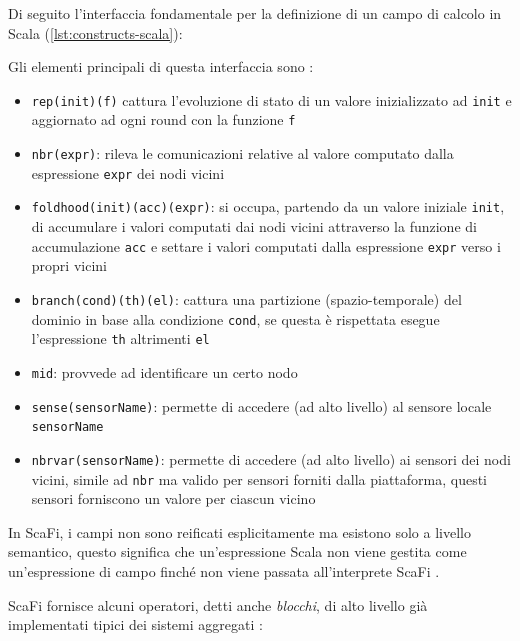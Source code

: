 \documentclass[12pt,a4paper,openright,twoside]{book}
\begin{document}
Di seguito l'interfaccia fondamentale per la definizione di un campo di calcolo in Scala (\cref{lst:constructs-scala}):



Gli elementi principali di questa interfaccia sono \cite{Casadei2022}:
\begin{itemize}
    \item \verb|rep(init)(f)| cattura l'evoluzione di stato di un valore inizializzato ad \verb|init| e aggiornato ad ogni round con la funzione \verb|f|
    \item \verb|nbr(expr)|: rileva le comunicazioni relative al valore computato dalla espressione \verb|expr| dei nodi vicini
    \item \verb|foldhood(init)(acc)(expr)|: si occupa, partendo da un valore iniziale \verb|init|, di accumulare i valori computati dai nodi vicini attraverso la funzione di accumulazione \verb|acc| e settare i valori computati dalla espressione \verb|expr| verso i propri vicini
    \item \verb|branch(cond)(th)(el)|: cattura una partizione (spazio-temporale) del dominio in base alla condizione \verb|cond|, se questa è rispettata esegue l'espressione \verb|th| altrimenti \verb|el|
    \item \verb|mid|: provvede ad identificare un certo nodo
    \item \verb|sense(sensorName)|: permette di accedere (ad alto livello) al sensore locale \verb|sensorName|
    \item \verb|nbrvar(sensorName)|: permette di accedere (ad alto livello) ai sensori dei nodi vicini, simile ad \verb|nbr| ma valido per sensori forniti dalla piattaforma, questi sensori forniscono un valore per ciascun vicino
\end{itemize}

In ScaFi, i campi non sono reificati esplicitamente ma esistono solo a livello semantico, questo significa che un'espressione Scala non viene gestita come un'espressione di campo finché non viene passata all'interprete ScaFi \cite{CasadeiPhDThesis}.

ScaFi fornisce alcuni operatori, detti anche \textit{blocchi}, di alto livello già implementati tipici dei sistemi aggregati \cite{Casadei2022}:
\end{document}
